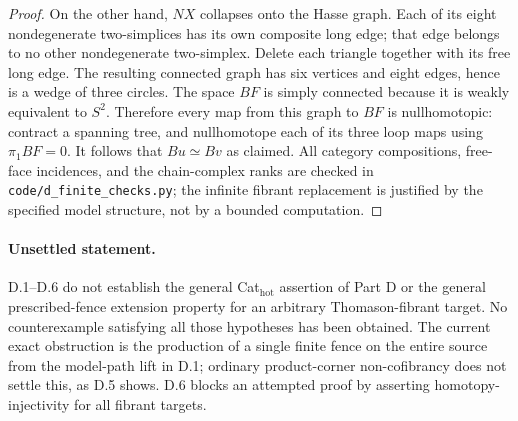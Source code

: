 \begin{proof}
On the other hand, $NX$ collapses onto the Hasse graph. Each of its eight nondegenerate two-simplices has its own composite long edge; that edge belongs to no other nondegenerate two-simplex. Delete each triangle together with its free long edge. The resulting connected graph has six vertices and eight edges, hence is a wedge of three circles. The space $BF$ is simply connected because it is weakly equivalent to $S^2$. Therefore every map from this graph to $BF$ is nullhomotopic: contract a spanning tree, and nullhomotope each of its three loop maps using $\pi_1BF=0$. It follows that $Bu\simeq Bv$ as claimed. All category compositions, free-face incidences, and the chain-complex ranks are checked in \texttt{code/d\_finite\_checks.py}; the infinite fibrant replacement is justified by the specified model structure, not by a bounded computation.
\end{proof}

\paragraph{Unsettled statement.}
D.1--D.6 do not establish the general Cat$_{\mathrm{hot}}$ assertion of Part D or the general prescribed-fence extension property for an arbitrary Thomason-fibrant target. No counterexample satisfying all those hypotheses has been obtained. The current exact obstruction is the production of a single finite fence on the entire source from the model-path lift in D.1; ordinary product-corner non-cofibrancy does not settle this, as D.5 shows. D.6 blocks an attempted proof by asserting homotopy-injectivity for all fibrant targets.
